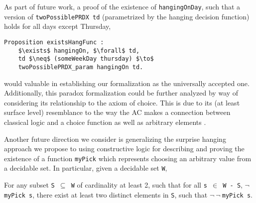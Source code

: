 \documentclass[journal]{journal}
\newenvironment{myindent}{\begin{adjustwidth}{1cm}{}}{\end{adjustwidth}}
\begin{document}
As part of future work, a proof of the existence of {\tt hangingOnDay}, such that
a version of {\tt twoPossiblePRDX td} (parametrized by the hanging decision
function) holds for all days except Thursday,

\begin{lstlisting}[mathescape=true]
  Proposition existsHangFunc :
    $\exists$ hangingOn, $\forall$ td,
    td $\neq$ (someWeekDay thursday) $\to$
    twoPossiblePRDX_param hangingOn td.
\end{lstlisting}

would valuable in
establishing our formalization as the universally accepted one. Additionally,
this paradox formalization could be further analyzed by way of considering its
relationship to the axiom of choice. This is due to its (at least surface level)
resemblance to the way the AC makes a connection between classical logic
and a choice function \cite{accomp} as well as arbitrary elements \cite{randomness}.

Another future direction we consider is generalizing the surprise hanging
approach we propose to using constructive logic for describing and proving
the existence of a function {\tt myPick}
which represents choosing an arbitrary value from a decidable set. In particular,
given a decidable set {\tt W}, \newline

\begin{myindent}
For any subset {\tt S $\subseteq$ W} of cardinality at least 2, such that for all
{\tt s $\in$ W - S}, $\neg ${\tt myPick s}, there exist at least two distinct
elements in {\tt S}, such that $\neg~\neg~${\tt myPick s}.
\end{myindent}


%
%
\end{document}
